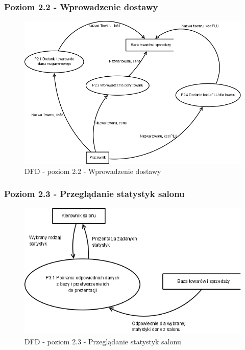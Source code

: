 \subsubsection{Poziom 2.2 - Wprowadzenie dostawy}
\begin{figure}[h]
\includegraphics[width=1\textwidth]{gfx/dfd-2-2.png}
\caption{DFD - poziom 2.2 - Wprowadzenie dostawy}
\end{figure}
\clearpage
\subsubsection{Poziom 2.3 - Przeglądanie statystyk salonu}
\begin{figure}[h]
\includegraphics[width=1\textwidth]{gfx/dfd-2-3.png}
\caption{DFD - poziom 2.3 - Przeglądanie statystyk salonu}
\end{figure}
\clearpage

